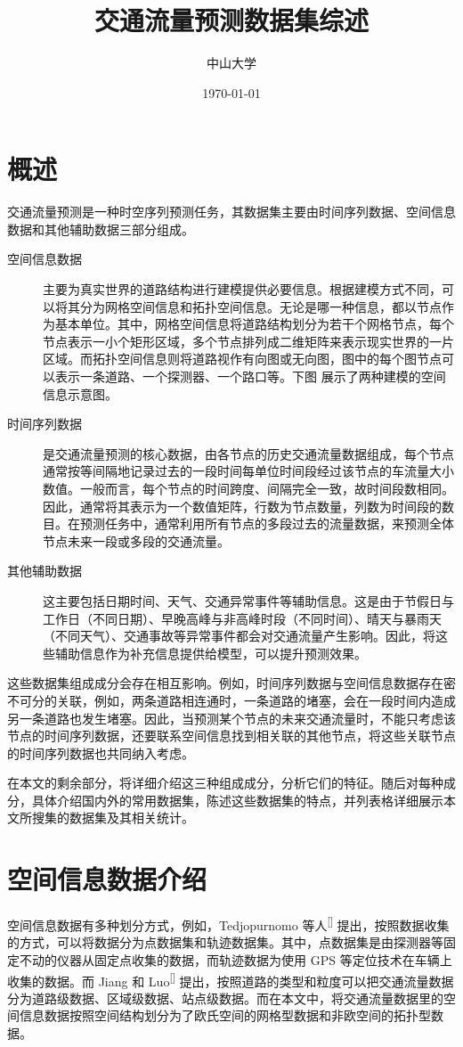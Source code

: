 \documentclass{ctexart}
\renewcommand{\cite}[1]{\textsuperscript{[\citenum{#1}]}}
\begin{document}
\title{交通流量预测数据集综述}
\author{中山大学}
\date{\today}
\maketitle
\tableofcontents
\section{概述}

交通流量预测是一种时空序列预测任务，其数据集主要由时间序列数据、空间信息数据和其他辅助数据三部分组成。

\begin{description}
    \item[空间信息数据] 主要为真实世界的道路结构进行建模提供必要信息。根据建模方式不同，可以将其分为网格空间信息和拓扑空间信息。无论是哪一种信息，都以节点作为基本单位。其中，网格空间信息将道路结构划分为若干个网格节点，每个节点表示一小个矩形区域，多个节点排列成二维矩阵来表示现实世界的一片区域。而拓扑空间信息则将道路视作有向图或无向图，图中的每个图节点可以表示一条道路、一个探测器、一个路口等。下图 展示了两种建模的空间信息示意图。%
    \item[时间序列数据] 是交通流量预测的核心数据，由各节点的历史交通流量数据组成，每个节点通常按等间隔地记录过去的一段时间每单位时间段经过该节点的车流量大小数值。一般而言，每个节点的时间跨度、间隔完全一致，故时间段数相同。因此，通常将其表示为一个数值矩阵，行数为节点数量，列数为时间段的数目。在预测任务中，通常利用所有节点的多段过去的流量数据，来预测全体节点未来一段或多段的交通流量。
    \item[其他辅助数据] 这主要包括日期时间、天气、交通异常事件等辅助信息。这是由于节假日与工作日（不同日期）、早晚高峰与非高峰时段（不同时间）、晴天与暴雨天（不同天气）、交通事故等异常事件都会对交通流量产生影响。因此，将这些辅助信息作为补充信息提供给模型，可以提升预测效果。
\end{description}

这些数据集组成成分会存在相互影响。例如，时间序列数据与空间信息数据存在密不可分的关联，例如，两条道路相连通时，一条道路的堵塞，会在一段时间内造成另一条道路也发生堵塞。因此，当预测某个节点的未来交通流量时，不能只考虑该节点的时间序列数据，还要联系空间信息找到相关联的其他节点，将这些关联节点的时间序列数据也共同纳入考虑。

在本文的剩余部分，将详细介绍这三种组成成分，分析它们的特征。随后对每种成分，具体介绍国内外的常用数据集，陈述这些数据集的特点，并列表格详细展示本文所搜集的数据集及其相关统计。

\section{空间信息数据介绍}
空间信息数据有多种划分方式，例如，Tedjopurnomo 等人\cite{tedjopurnomo_survey_2022} 提出，按照数据收集的方式，可以将数据分为点数据集和轨迹数据集。其中，点数据集是由探测器等固定不动的仪器从固定点收集的数据，而轨迹数据为使用 GPS 等定位技术在车辆上收集的数据。而 Jiang 和 Luo\cite{jiang_graph_2022} 提出，按照道路的类型和粒度可以把交通流量数据分为道路级数据、区域级数据、站点级数据。而在本文中，将交通流量数据里的空间信息数据按照空间结构划分为了欧氏空间的网格型数据和非欧空间的拓扑型数据。
\end{document}
